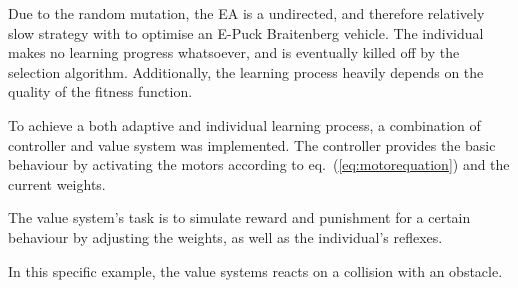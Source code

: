 \documentclass[a4paper]{jacow}
\begin{document}
Due to the random mutation, the EA is a undirected, and therefore relatively slow strategy with to optimise an E-Puck Braitenberg vehicle. The individual makes no learning progress whatsoever, and is eventually killed off by the selection algorithm. Additionally, the learning process heavily depends on the quality of the fitness function.

To achieve a both adaptive and individual learning process, a combination of controller and value system was implemented. The controller provides the basic behaviour by activating the motors according to eq.~(\ref{eq:motorequation}) and the current weights.

The value system's task is to simulate reward and punishment for a certain behaviour by adjusting the weights, as well as the individual's reflexes.

In this specific example, the value systems reacts on a collision with an obstacle.
\end{document}
